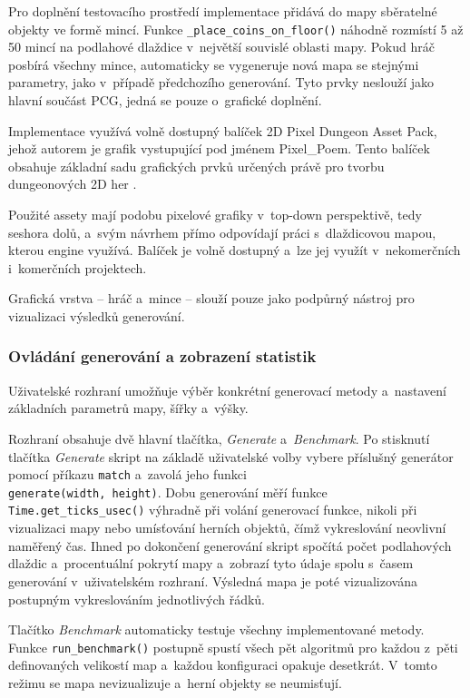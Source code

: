 \documentclass[
   program=itk,
   biblatex,
   figures=true,
   tables=true,
   glossaries,
   index
]{kidiplom}
\begin{document}
Pro doplnění testovacího prostředí implementace přidává do mapy sběratelné objekty ve formě mincí. Funkce \texttt{\_place\_coins\_on\_floor()} náhodně rozmístí 5 až 50 mincí na podlahové dlaždice v~největší souvislé oblasti mapy. Pokud hráč posbírá všechny mince, automaticky se vygeneruje nová mapa se stejnými parametry, jako v~případě předchozího generování. Tyto prvky neslouží jako hlavní součást PCG, jedná se pouze o~grafické doplnění.

Implementace využívá volně dostupný balíček 2D Pixel Dungeon Asset Pack, jehož autorem je grafik vystupující pod jménem Pixel\_Poem. Tento balíček obsahuje základní sadu grafických prvků určených právě pro tvorbu dungeonových 2D her \cite{pixel_dungeon_asset}.

Použité assety mají podobu pixelové grafiky v~top-down perspektivě, tedy seshora dolů, a~svým návrhem přímo odpovídají práci s~dlaždicovou mapou, kterou engine využívá. Balíček je volně dostupný a~lze jej využít v~nekomerčních i~komerčních projektech.

Grafická vrstva -- hráč a~mince -- slouží pouze jako podpůrný nástroj pro vizualizaci výsledků generování.

\subsubsection{Ovládání generování a zobrazení statistik}

Uživatelské rozhraní umožňuje výběr konkrétní generovací metody a~nastavení základních parametrů mapy, šířky a~výšky.

Rozhraní obsahuje dvě hlavní tlačítka, \textit{Generate} a~\textit{Benchmark}. Po stisknutí tlačítka \textit{Generate} skript na základě uživatelské volby vybere příslušný generátor pomocí příkazu \texttt{match} a~zavolá jeho funkci \\ \texttt{generate(width, height)}. Dobu generování měří funkce \\ \texttt{Time.get\_ticks\_usec()} výhradně při volání generovací funkce, nikoli při vizualizaci mapy nebo umísťování herních objektů, čímž vykreslování neovlivní naměřený čas. Ihned po dokončení generování skript spočítá počet podlahových dlaždic a~procentuální pokrytí mapy a~zobrazí tyto údaje spolu s~časem generování v~uživatelském rozhraní. Výsledná mapa je poté vizualizována postupným vykreslováním jednotlivých řádků.

Tlačítko \textit{Benchmark} automaticky testuje všechny implementované metody. Funkce \texttt{run\_benchmark()} postupně spustí všech pět algoritmů pro každou z~pěti definovaných velikostí map a~každou konfiguraci opakuje desetkrát. V~tomto režimu se mapa nevizualizuje a~herní objekty se neumisťují.
\end{document}
